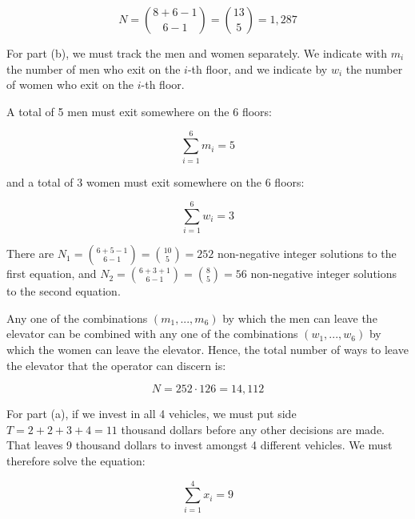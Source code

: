 \documentclass[a4paper,12pt]{article}
\begin{document}
\[ N = \binom{8+6-1}{6-1} = \binom{13}{5} = 1,287 \]

For part (b), we must track the men and women separately. We indicate with $m_i$ the number of men who exit on the $i$-th floor, and we indicate by $w_i$ the number of women who exit on the $i$-th floor. 

A total of 5 men must exit somewhere on the 6 floors:

\[ \sum_{i=1}^6 m_i = 5 \]

\noindent
and a total of 3 women must exit somewhere on the 6 floors:

\[ \sum_{i=1}^6 w_i = 3 \]

There are $N_1 = \binom{6+5-1}{6-1} = \binom{10}{5} = 252$ non-negative integer solutions to the first equation, and $N_2 = \binom{6+3+1}{6-1} = \binom{8}{5} = 56$ non-negative integer solutions to the second equation. 

Any one of the combinations $(m_1,...,m_6)$ by which the men can leave the elevator can be combined with any one of the combinations $(w_1, ..., w_6)$ by which the women can leave the elevator. Hence, the total number of ways to leave the elevator that the operator can discern is:

\[ N = 252 \cdot 126 = 14,112 \]

\pagebreak
{}

For part (a), if we invest in all 4 vehicles, we must put side $T = 2 + 2 + 3 + 4 = 11$ thousand dollars before any other decisions are made. That leaves 9 thousand dollars to invest amongst 4 different vehicles. We must therefore solve the equation:

\[ \sum_{i=1}^4 x_i = 9\]
\end{document}

